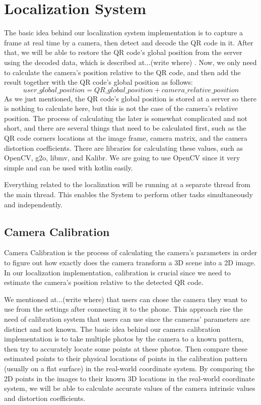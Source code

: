 \section{Localization System}
The basic idea behind our localization system implementation is to capture a frame at real time by a camera, then detect and decode the QR code in it. After that, we will be able to restore the QR code's global position from the server using the decoded data, \color{blue}which is described at...(write where) \color{black}. Now, we only need to calculate the camera's position relative to the QR code, and then add the result together with the QR code's global position as follows:
\[ user\_global\_position = QR\_global\_position +  camera\_relative\_position\]
As we just mentioned, the QR code's global position is stored at a server so there is nothing to calculate here, but this is not the case of the camera's relative position. The process of calculating the later is somewhat complicated and not short, and there are several things that need to be calculated first, such as the QR code corners locations at the image frame, camera matrix, and the camera distortion coefficients. There are libraries for calculating these values, such as OpenCV, g2o, libmv, and Kalibr. We are going to use OpenCV since it very simple and can be used with kotlin easily.

Everything related to the localization will be running at a separate thread from the main thread. This enables the System to perform other tasks simultaneously and independently.

\subsection{Camera Calibration}
Camera Calibration is the process of calculating the camera's parameters in order to figure out how exactly does the camera transform a 3D scene into a 2D image. In our localization implementation, calibration is crucial since we need to estimate the camera's position relative to the detected QR code. 

We mentioned \color{blue}at...(write where) \color{black} that users can chose the camera they want to use from the settings after connecting it to the phone. This approach rise the need of calibration system that users can use since the cameras' parameters are distinct and not known. The basic idea behind our camera calibration implementation is to take multiple photos by the camera to a known pattern, then try to accurately locate some points at these photos. Then compare these estimated points to their physical locations of points in the calibration pattern (usually on a flat surface) in the real-world coordinate system. By comparing the 2D points in the images to their known 3D locations in the real-world coordinate system, we will be able to calculate accurate values of the camera intrinsic values and distortion coefficients.

